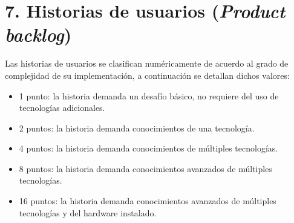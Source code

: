 \documentclass[
11pt, %
]{charter}
\begin{document}
\begin{enumerate}
\begin{enumerate}
		\end{enumerate}
\end{enumerate}






\section{7. Historias de usuarios (\textit{Product backlog})}
\label{sec:backlog}



Las historias de usuarios se clasifican numéricamente de acuerdo al grado de complejidad de su implementación, a continuación se detallan dichos valores:

\begin{itemize}
	\item 1 punto: la historia demanda un desafío básico, no requiere del uso de tecnologías adicionales.
	\item 2 puntos: la historia demanda conocimientos de una tecnología.
	\item 4 puntos: la historia demanda conocimientos de múltiples tecnologías.
	\item 8 puntos: la historia demanda conocimientos avanzados de múltiples tecnologías.
	\item 16 puntos: la historia demanda conocimientos avanzados de múltiples tecnologías y del hardware instalado.
\end{itemize}
\end{document}
